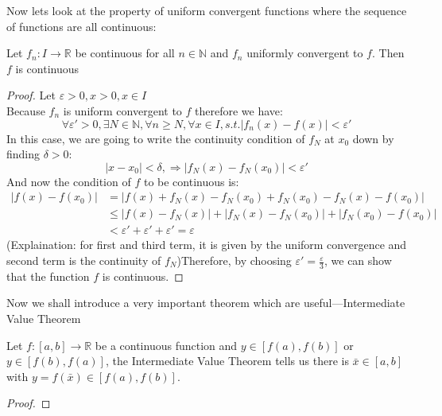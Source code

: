 \documentclass{article}
\newcommand{\N}{\mathbb{N}}
\newcommand{\R}{\mathbb{R}}
\begin{document}
Now lets look at the property of uniform convergent functions where the sequence of functions are all continuous:
\begin{theorem}
	Let $f_n:I\to \R$ be continuous for all $n\in \N$ and $f_n$ uniformly convergent to $f$. Then $f$ is continuous 
\end{theorem}

\begin{proof}
Let $\varepsilon>0, x>0,x\in I$\\ 
	Because $f_n$ is uniform convergent to $f$ therefore we have:
	\begin{equation*}
		\forall \varepsilon' >0, \exists N\in \N , \forall n\geq N, \forall {x}\in I, s.t. |f_n({x})-f({x})|<\varepsilon'
	\end{equation*}
	In this case, we are going to write the continuity condition of $f_N$ at $x_0$ down by finding $\delta>0$:
	\begin{equation*}
		|x-x_0|<\delta, \Rightarrow |f_N(x)-f_N(x_0)|<\varepsilon'
	\end{equation*}
	And now the condition of $f$ to be continuous is:
	\begin{equation*}
	\begin{aligned}
		|f(x)-f(x_0)| &=|f(x)+f_N(x)-f_N(x_0)+f_N(x_0)-f_N(x)-f(x_0)|\\
		&\leq|f(x)-f_N(x)| + |f_N(x)-f_N(x_0)|+|f_N(x_0)-f(x_0)|\\
		&< \varepsilon'+\varepsilon'+\varepsilon'=\varepsilon
		\end{aligned}
	\end{equation*}
	(Explaination: for first and third term, it is given by the uniform convergence and second term is the continuity of $f_N$)Therefore, by choosing $\varepsilon'=\frac{\varepsilon}{3}$, we can show that the function $f$ is continuous.
\end{proof}
Now we shall introduce a very important theorem which are useful---Intermediate Value Theorem

\begin{theorem}
	Let $f:[a,b]\to \R$ be a continuous function and $y\in [f(a),f(b)]$ or $y\in [f(b),f(a)]$, the Intermediate Value Theorem tells us there is $\bar{x}\in [a,b]$ with $y=f(\bar{x})\in [f(a),f(b)]$.
\end{theorem}

\begin{proof}
	
\end{proof}
\end{document}
